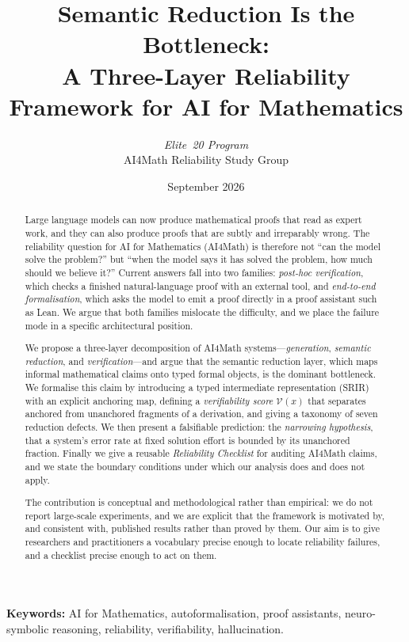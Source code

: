 \documentclass[11pt,a4paper]{article}
\title{\bfseries Semantic Reduction Is the Bottleneck:\\ A Three-Layer Reliability Framework for AI for Mathematics}
\author{%
  \textit{Elite~20 Program} \\[2pt]
  \small AI4Math Reliability Study Group
}
\date{September 2026}
\theoremstyle{definition}
\theoremstyle{plain}
\theoremstyle{remark}
\newcommand{\V}{\mathcal{V}}           %
\begin{document}
\maketitle

\begin{abstract}
\noindent
Large language models can now produce mathematical proofs that read as expert
work, and they can also produce proofs that are subtly and irreparably wrong.
The reliability question for AI for Mathematics (AI4Math) is therefore not
``can the model solve the problem?'' but ``when the model says it has solved
the problem, how much should we believe it?'' Current answers fall into two
families: \emph{post-hoc verification}, which checks a finished natural-language
proof with an external tool, and \emph{end-to-end formalisation}, which asks the
model to emit a proof directly in a proof assistant such as Lean.
We argue that both families mislocate the difficulty, and we place the failure
mode in a specific architectural position.

We propose a three-layer decomposition of AI4Math systems---\emph{generation},
\emph{semantic reduction}, and \emph{verification}---and argue that the
semantic reduction layer, which maps informal mathematical claims onto typed
formal objects, is the dominant bottleneck. We formalise this claim by
introducing a typed intermediate representation (SRIR) with an explicit
anchoring map, defining a \emph{verifiability score} $\V(x)$ that separates
anchored from unanchored fragments of a derivation, and giving a taxonomy of
seven reduction defects. We then present a falsifiable prediction: the
\emph{narrowing hypothesis}, that a system's error rate at fixed solution effort
is bounded by its unanchored fraction. Finally we give a reusable
\emph{Reliability Checklist} for auditing AI4Math claims, and we state the
boundary conditions under which our analysis does and does not apply.

The contribution is conceptual and methodological rather than empirical: we do
not report large-scale experiments, and we are explicit that the framework is
motivated by, and consistent with, published results rather than proved by
them. Our aim is to give researchers and practitioners a vocabulary precise
enough to locate reliability failures, and a checklist precise enough to act on
them.
\end{abstract}

\noindent\textbf{Keywords:} AI for Mathematics, autoformalisation, proof
assistants, neuro-symbolic reasoning, reliability, verifiability, hallucination.
\end{document}
